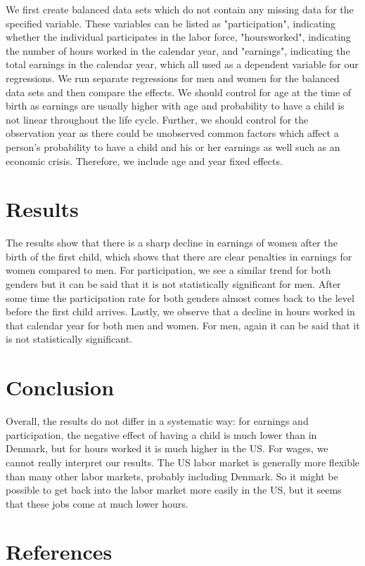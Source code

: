 \documentclass[11pt, a4paper, leqno]{article}
\begin{document}
We first create balanced data sets which do not contain any missing data for the specified variable. These variables can be listed as "participation", indicating whether the individual participates in the labor force, "hoursworked", indicating the number of hours worked in the calendar year, and "earnings", indicating the total earnings in the calendar year, which all used as a dependent variable for our regressions.  We run separate regressions for men and women for the balanced data sets and then compare the effects. We should control for age at the time of birth as earnings are usually higher with age and probability to have a child is not linear throughout the life cycle. Further, we should control for the observation year as there could be unobserved common factors which affect a person’s probability to have a child and his or her earnings as well such as an economic crisis.  Therefore, we include age and year fixed effects.


\section*{Results}

The results show that there is a sharp decline in earnings of women after the birth of the first child, which shows that there are clear penalties in earnings for women compared to men. For participation, we see a similar trend for both genders but it can be said that it is not statistically significant for men. After some time the participation rate for both genders almost comes back to the level before the first child arrives. Lastly, we observe that a decline in hours worked in that calendar year for both men and women. For men, again it can be said that it is not statistically significant. 

\section*{Conclusion}

Overall, the results do not differ in a systematic way: for earnings and participation, the negative effect of having a child is much lower than in Denmark, but for hours worked it is much higher in the US. For wages, we cannot really interpret our results. The US labor market is generally more flexible than many other labor markets, probably including Denmark. So it might be possible to get back into the labor market more easily in the US, but it seems that these jobs come at much lower hours.


\printbibliography
{}

\section*{References}
\citet{Kleven, H., Landais, C., & SSgaard, J. (2018). Children and Gender Inequality: }
\newline
\citet{Children and Gender Inequality: Evidence from Denmark. SSRN Electronic Journal.}
\newline
\citet{GaudeckerEconProjectTemplates}
\end{document}
